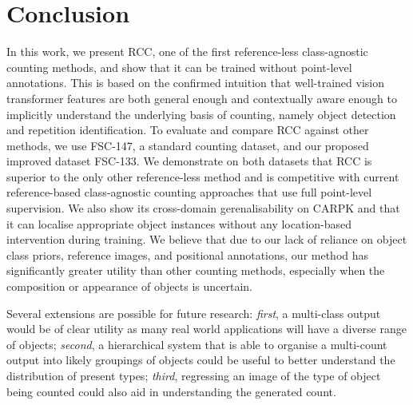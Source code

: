 \documentclass[letterpaper, 11pt]{IEEEtran}
\begin{document}
\section{Conclusion}
\label{conclusion}
In this work, we present RCC, one of the first reference-less class-agnostic counting methods,
and show that it can be trained without point-level annotations.
This is based on the confirmed intuition that well-trained vision transformer features are both general enough and contextually aware enough to implicitly understand the underlying basis of counting, namely object detection and repetition identification. 
To evaluate and compare RCC against other methods, we use FSC-147, a standard counting dataset, and our proposed improved dataset FSC-133.
We demonstrate on both datasets that RCC is superior to the only other reference-less method and is competitive with current reference-based class-agnostic counting approaches that use full point-level supervision. We also show its cross-domain gerenalisability on CARPK and that it can localise appropriate object instances without any location-based intervention during training.
We believe that due to our lack of reliance on object class priors, reference images, and positional annotations, our method has significantly greater utility than other counting methods, especially when the composition or appearance of objects is uncertain.


Several extensions are possible for future research: \textit{first}, a multi-class output would be of clear utility as many real world applications will have a diverse range of objects; \textit{second}, a hierarchical system that is able to organise a multi-count output into likely groupings of objects could be useful to better understand the distribution of present types; \textit{third}, regressing an image of the type of object being counted could also aid in understanding the generated count.
\clearpage


\clearpage

\end{document}
